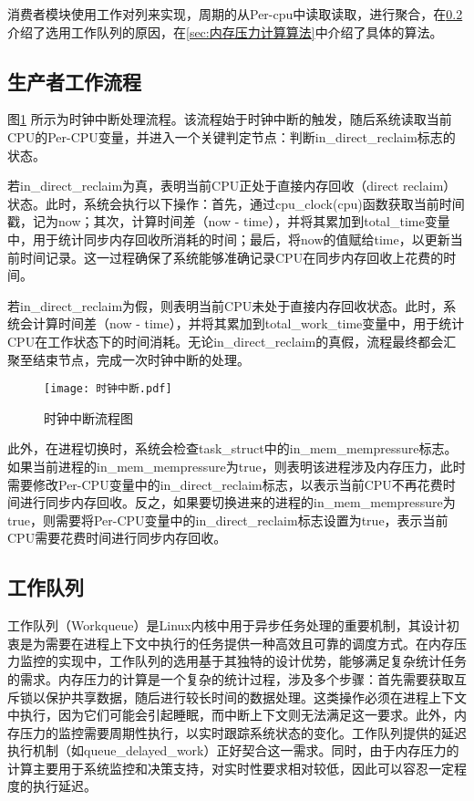 消费者模块使用工作对列来实现，周期的从Per-cpu中读取读取，进行聚合，在\ref{sec:工作队列}介绍了选用工作队列的原因，在\ref{sec:内存压力计算算法}中介绍了具体的算法。


\subsection{生产者工作流程}

图\ref{fig:time-ticker} 所示为时钟中断处理流程。该流程始于时钟中断的触发，随后系统读取当前CPU的Per-CPU变量，并进入一个关键判定节点：判断in\_direct\_reclaim标志的状态。

若in\_direct\_reclaim为真，表明当前CPU正处于直接内存回收（direct reclaim）状态。此时，系统会执行以下操作：首先，通过cpu\_clock(cpu)函数获取当前时间戳，记为now；其次，计算时间差（now - time），并将其累加到total\_time变量中，用于统计同步内存回收所消耗的时间；最后，将now的值赋给time，以更新当前时间记录。这一过程确保了系统能够准确记录CPU在同步内存回收上花费的时间。

若in\_direct\_reclaim为假，则表明当前CPU未处于直接内存回收状态。此时，系统会计算时间差（now - time），并将其累加到total\_work\_time变量中，用于统计CPU在工作状态下的时间消耗。无论in\_direct\_reclaim的真假，流程最终都会汇聚至结束节点，完成一次时钟中断的处理。

\begin{figure}[h]
    \centering
    \texttt{[image: 时钟中断.pdf]}
    \caption{时钟中断流程图}
    \label{fig:time-ticker}
\end{figure}


此外，在进程切换时，系统会检查task\_struct中的in\_mem\_mempressure标志。如果当前进程的in\_mem\_mempressure为true，则表明该进程涉及内存压力，此时需要修改Per-CPU变量中的in\_direct\_reclaim标志，以表示当前CPU不再花费时间进行同步内存回收。反之，如果要切换进来的进程的in\_mem\_mempressure为true，则需要将Per-CPU变量中的in\_direct\_reclaim标志设置为true，表示当前CPU需要花费时间进行同步内存回收。


\subsection{工作队列}
\label{sec:工作队列}

工作队列（Workqueue）是Linux内核中用于异步任务处理的重要机制，其设计初衷是为需要在进程上下文中执行的任务提供一种高效且可靠的调度方式。在内存压力监控的实现中，工作队列的选用基于其独特的设计优势，能够满足复杂统计任务的需求。内存压力的计算是一个复杂的统计过程，涉及多个步骤：首先需要获取互斥锁以保护共享数据，随后进行较长时间的数据处理。这类操作必须在进程上下文中执行，因为它们可能会引起睡眠，而中断上下文则无法满足这一要求。此外，内存压力的监控需要周期性执行，以实时跟踪系统状态的变化。工作队列提供的延迟执行机制（如queue\_delayed\_work）正好契合这一需求。同时，由于内存压力的计算主要用于系统监控和决策支持，对实时性要求相对较低，因此可以容忍一定程度的执行延迟。

